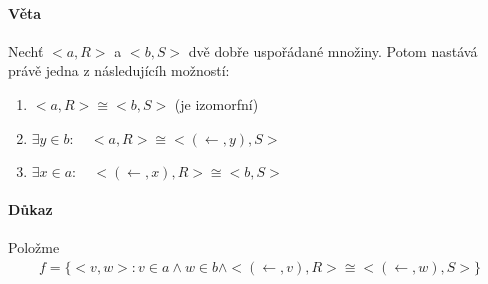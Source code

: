 \documentclass[a4paper,12pt,titlepage]{article}
\begin{document}
\paragraph{Věta}
Nechť $<a,R>$ a $<b,S>$ dvě dobře uspořádané množiny. Potom nastává právě jedna
z následujícíh možností:
\begin{enumerate}
	\item $<a,R> \cong <b,S>$ (je izomorfní)
	\item $\exists y \in b: \quad <a,R> \cong <(\leftarrow,y), S>$
	\item $\exists x \in a: \quad <(\leftarrow, x), R> \cong <b,S>$
\end{enumerate}
\paragraph{Důkaz}
Položme 
\begin{align}
f = \{ <v,w> : v \in a \land w \in b \land <(\leftarrow,v), R> \cong <(\leftarrow, w), S>\}
\end{align}
\end{document}
